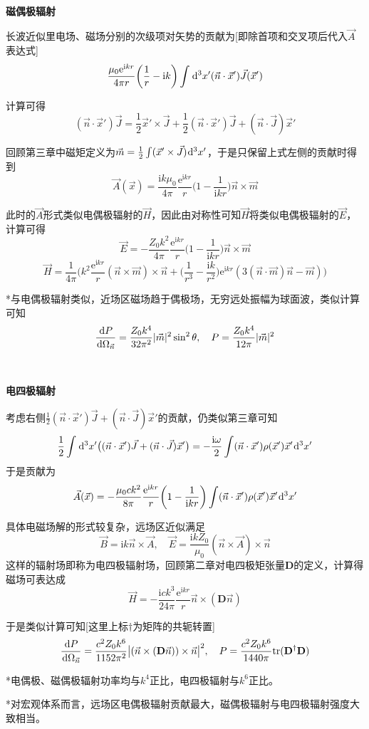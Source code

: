 \documentclass[a4paper,UTF8,fontset=windows]{ctexart}
\newcommand*{\dr}{\hspace{0.07em}\mathrm{d}}
\newcommand*{\er}{\mathrm{e}}
\newcommand*{\ir}{\mathrm{i}}
\newcommand*{\va}{\vec{A}}
\newcommand*{\vb}{\vec{B}}
\newcommand*{\ve}{\vec{E}}
\newcommand*{\vh}{\vec{H}}
\newcommand*{\vj}{\vec{J}}
\newcommand*{\vms}{\vec{m}}
\newcommand*{\vns}{\vec{n}}
\newcommand*{\vx}{\vec{x}}
\newcommand*{\dt}[2][t]{\frac{\dr #2}{\dr #1}}
\begin{document}
\

\textbf{磁偶极辐射}

长波近似里电场、磁场分别的次级项对矢势的贡献为[即除首项和交叉项后代入$\va$表达式]
$$\frac{\mu_0\er^{\ir kr}}{4\pi r}\bigg(\frac{1}{r}-\ir k\bigg)\int\dr^3x'(\vns\cdot\vx')\vj(\vx')$$

计算可得
$$(\vns\cdot\vx')\vj=\frac{1}{2}\vx'\times\vj+\frac{1}{2}(\vns\cdot\vx')\vj+(\vns\cdot\vj)\vx'$$

回顾第三章中磁矩定义为$\vms=\frac{1}{2}\int(\vx'\times\vj)\dr^3x'$，于是只保留上式左侧的贡献时得到
$$\va(\vx)=\frac{\ir k\mu_0}{4\pi}\frac{\er^{\ir kr}}{r}\bigg(1-\frac{1}{\ir kr}\bigg)\vns\times\vms$$

此时的$\va$形式类似电偶极辐射的$\vh$，因此由对称性可知$\vh$将类似电偶极辐射的$\ve$，计算可得
$$\ve=-\frac{Z_0k^2}{4\pi}\frac{\er^{\ir kr}}{r}\bigg(1-\frac{1}{\ir kr}\bigg)\vns\times\vms$$
$$\vh=\frac{1}{4\pi}\bigg(k^2\frac{\er^{\ir kr}}{r}(\vns\times\vms)\times\vns+\bigg(\frac{1}{r^3}-\frac{\ir k}{r^2}\bigg)\er^{\ir kr}(3(\vns\cdot\vms)\vns-\vms)\bigg)$$

*与电偶极辐射类似，近场区磁场趋于偶极场，无穷远处振幅为球面波，类似计算可知
$$\dt[\Omega_{\vns}]{P}=\frac{Z_0k^4}{32\pi^2}|\vms|^2\sin^2\theta,\quad P=\frac{Z_0k^4}{12\pi}|\vms|^2$$

\

\textbf{电四极辐射}

考虑右侧$\frac{1}{2}(\vns\cdot\vx')\vj+(\vns\cdot\vj)\vx'$的贡献，仍类似第三章可知
$$\frac{1}{2}\int\dr^3x'\big((\vns\cdot\vx')\vj+(\vns\cdot\vj)\vx'\big)=-\frac{\ir\omega}{2}\int(\vns\cdot\vx')\rho(\vx')\vx'\dr^3x'$$
于是贡献为
$$\va(\vx)=-\frac{\mu_0ck^2}{8\pi}\frac{\er^{\ir kr}}{r}\bigg(1-\frac{1}{\ir kr}\bigg)\int(\vns\cdot\vx')\rho(\vx')\vx'\dr^3x'$$

具体电磁场解的形式较复杂，远场区近似满足
$$\vb=\ir k\vns\times\va,\quad\ve=\frac{\ir kZ_0}{\mu_0}(\vns\times\va)\times\vns$$
这样的辐射场即称为电四极辐射场，回顾第二章对电四极矩张量$\mathbf{D}$的定义，计算得磁场可表达成
$$\vh=-\frac{\ir ck^3}{24\pi}\frac{\er^{\ir kr}}{r}\vns\times(\mathbf{D}\vns)$$

于是类似计算可知[这里上标$\dagger$为矩阵的共轭转置]
$$\dt[\Omega_{\vns}]{P}=\frac{c^2Z_0k^6}{1152\pi^2}\big|(\vns\times(\mathbf{D}\vns))\times\vns\big|^2,\quad P=\frac{c^2Z_0k^6}{1440\pi}\mathrm{tr}(\mathbf{D}^\dagger\mathbf{D})$$

*电偶极、磁偶极辐射功率均与$k^4$正比，电四极辐射与$k^6$正比。

*对宏观体系而言，远场区电偶极辐射贡献最大，磁偶极辐射与电四极辐射强度大致相当。
\end{document}
